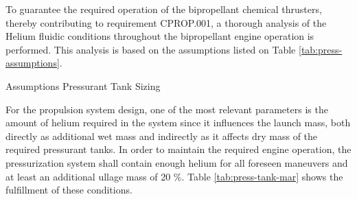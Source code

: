 \documentclass[conference]{IEEEtran}
\begin{document}
To guarantee the required operation of the bipropellant chemical thrusters, thereby contributing to requirement CPROP.001, a thorough analysis of the Helium fluidic conditions throughout the bipropellant engine operation is performed. This analysis is based on the assumptions listed on Table \ref{tab:press-assumptions}.
\begin{table} [H]
\centering
\caption{Assumptions Pressurant Tank Sizing}
\label{tab:press-assumptions}
\end{table}
For the propulsion system design, one of the most relevant parameters is the amount of helium required in the system since it influences the launch mass, both directly as additional wet mass and indirectly as it affects dry mass of the required pressurant tanks. In order to maintain the required engine operation, the pressurization system shall contain enough helium for all foreseen maneuvers and at least an additional ullage mass of 20 \%. Table \ref{tab:press-tank-mar} shows the fulfillment of these conditions. 
\end{document}
